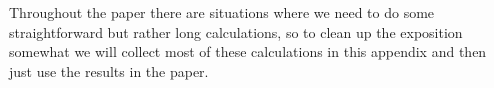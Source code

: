 Throughout the paper there are situations where we need to do some straightforward but rather long calculations, so to clean up the exposition somewhat we will collect most of these calculations in this appendix and then just use the results in the paper.

